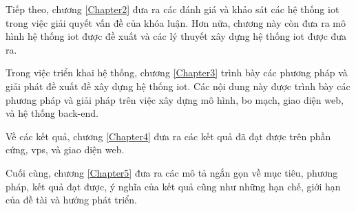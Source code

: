 Tiếp theo, chương \ref{Chapter2} đưa ra các đánh giá và khảo sát các hệ thống \acrshort{iot} trong việc giải quyết vấn đề của khóa luận. Hơn nữa, chương này còn đưa ra mô hình hệ thống \acrshort{iot} được đề xuất và các lý thuyết xây dựng hệ thống \acrshort{iot} được đưa ra.

Trong việc triển khai hệ thống, chương \ref{Chapter3} trình bày các phương pháp và giải phát đề xuất đề xây dựng hệ thống \acrshort{iot}. Các nội dung này được trình bày các phương pháp và giải pháp trên việc xây dựng mô hình, bo mạch, giao diện web, và hệ thống back-end.

Về các kết quả, chương \ref{Chapter4} đưa ra các kết quả đã đạt được trên phần cứng, \acrshort{vps}, và giao diện web.

Cuối cùng, chương \ref{Chapter5} đưa ra các mô tả ngắn gọn về mục tiêu, phương pháp, kết quả đạt được, ý nghĩa của kết quả cũng như những hạn chế, giới hạn của đề tài và hướng phát triển.


